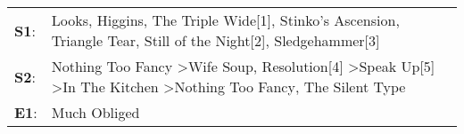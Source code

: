 \begin{supertabular}{p{0.03\textwidth}p{0.92\textwidth}}
 \textbf{S1}:  &                                                 Looks\textsuperscript{}, \enspace Higgins\textsuperscript{}, \enspace The Triple Wide[1]\textsuperscript{}, \enspace Stinko's Ascension\textsuperscript{}, \enspace Triangle Tear\textsuperscript{}, \enspace Still of the Night[2]\textsuperscript{}, \enspace Sledgehammer[3]\textsuperscript{}  \enspace  \\
 \textbf{S2}:  &  Nothing Too Fancy\textsuperscript{} \textgreater \enspace Wife Soup\textsuperscript{}, \enspace Resolution[4]\textsuperscript{} \textgreater \enspace Speak Up[5]\textsuperscript{} \textgreater \enspace In The Kitchen\textsuperscript{} \textgreater \enspace Nothing Too Fancy\textsuperscript{}, \enspace The Silent Type\textsuperscript{}  \enspace  \\
 \textbf{E1}:  &                                                                                                                                                                                                                                                                                                                    Much Obliged\textsuperscript{}  \enspace  \\
\end{supertabular}
